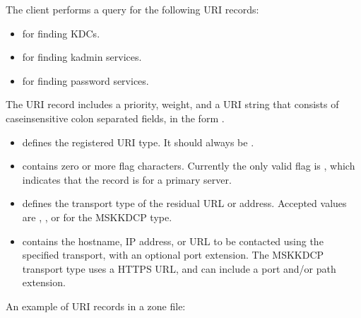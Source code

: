 \documentclass[letterpaper,10pt,english]{sphinxmanual}
\begin{document}
\sphinxAtStartPar
The client performs a query for the following URI records:
\begin{itemize}
\item {} 
\sphinxAtStartPar
{} for finding KDCs.

\item {} 
\sphinxAtStartPar
{} for finding kadmin services.

\item {} 
\sphinxAtStartPar
{} for finding password services.

\end{itemize}

\sphinxAtStartPar
The URI record includes a priority, weight, and a URI string that
consists of case\sphinxhyphen{}insensitive colon separated fields, in the form
.
\begin{itemize}
\item {} 
\sphinxAtStartPar
{} defines the registered URI type.  It should always be
.

\item {} 
\sphinxAtStartPar
{} contains zero or more flag characters.  Currently the only
valid flag is , which indicates that the record is for a
primary server.

\item {} 
\sphinxAtStartPar
{} defines the transport type of the residual URL or
address.  Accepted values are , , or  for the
MS\sphinxhyphen{}KKDCP type.

\item {} 
\sphinxAtStartPar
{} contains the hostname, IP address, or URL to be
contacted using the specified transport, with an optional port
extension.  The MS\sphinxhyphen{}KKDCP transport type uses a HTTPS URL, and can
include a port and/or path extension.

\end{itemize}

\sphinxAtStartPar
An example of URI records in a zone file:
\end{document}
